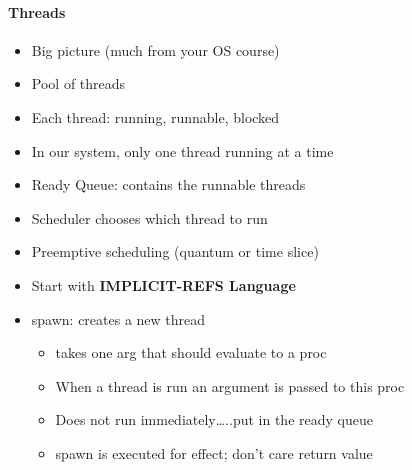 \documentclass{beamer}
\begin{document}
\begin{frame}[fragile]
\framesubtitle{Threads}
\begin{scriptsize}
\begin{itemize}
\item<1-> Big picture (much from your OS course)

\item<1-> Pool of threads

\item<1-> Each thread: running, runnable, blocked

\item<2-> In our system, only one thread running at a time

\item<2-> Ready Queue: contains the runnable threads

\item<2-> Scheduler chooses which thread to run

\item<2-> Preemptive scheduling (quantum or time slice)

\item<2-> Start with \textbf{IMPLICIT-REFS Language}

\item<3-> spawn: creates a new thread
\begin{itemize}
\item takes one arg that should evaluate to a proc

\item When a thread is run an argument is passed to this proc

\item Does not run immediately…..put in the ready queue

\item spawn is executed for effect; don’t care return value
\end{itemize}

\end{itemize}
\end{scriptsize}
\end{frame}
\end{document}
